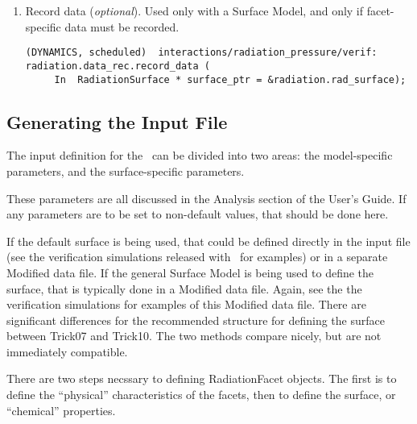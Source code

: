 \begin{enumerate}
\begin{itemize}
\begin{enumerate}
          \item{Record data (\textit{optional})}. \newline
            Used only with a Surface Model,
            and only if facet-specific data must be recorded.
\begin{verbatim}
(DYNAMICS, scheduled)  interactions/radiation_pressure/verif:
radiation.data_rec.record_data (
     In  RadiationSurface * surface_ptr = &radiation.rad_surface);
\end{verbatim}
        \end{enumerate}
    \end{itemize}
\end{enumerate}


\subsection{Generating the Input File}
The input definition for the \RadiationPressureDesc\ can be divided into two areas: the model-specific parameters, and the surface-specific parameters.

These parameters are all discussed in the Analysis section of the User's Guide.  If any parameters are to be set to non-default values, that should be done here.

If the default surface is being used, that could be defined directly in the input file (see the verification simulations released with \JEODid\ for examples) or in a separate Modified data file.  If the general Surface Model is being used to define the surface, that is typically done in a Modified data file.  Again, see the the verification simulations for examples of this Modified data file.  There are significant differences for the recommended structure for defining the surface between Trick07 and Trick10.  The two methods compare nicely, but are not immediately compatible.

There are two steps necssary to defining RadiationFacet objects.  The first is to define the ``physical'' characteristics of the facets, then to define the surface, or ``chemical'' properties.

